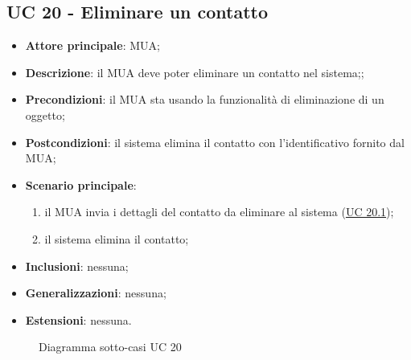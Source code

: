 \subsection{UC 20 - Eliminare un contatto} \label{sec:UC20}
    \begin{itemize}
        \item \textbf{Attore principale}: MUA;
        \item \textbf{Descrizione}: il MUA deve poter eliminare un contatto nel sistema;;
        \item \textbf{Precondizioni}: il MUA sta usando la funzionalità di eliminazione di un oggetto;
        \item \textbf{Postcondizioni}: il sistema elimina il contatto con l'identificativo fornito dal MUA;
        \item \textbf{Scenario principale}:
            \begin{enumerate}
                \item il MUA invia i dettagli del contatto da eliminare al sistema (\hyperref[sec:UC20.1]{UC 20.1});
                \item il sistema elimina il contatto;
            \end{enumerate}
        \item \textbf{Inclusioni}: nessuna;
        \item \textbf{Generalizzazioni}: nessuna;
        \item \textbf{Estensioni}: nessuna.
    \end{itemize}

\begin{figure}[h]
    \centering
    \caption{Diagramma sotto-casi UC 20}
\end{figure}


